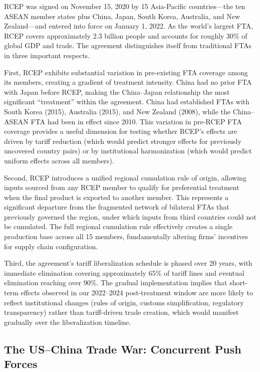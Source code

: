 \documentclass[preprint,12pt,authoryear]{elsarticle}
\begin{document}
RCEP was signed on November 15, 2020 by 15 Asia-Pacific countries---the ten ASEAN member states plus China, Japan, South Korea, Australia, and New Zealand---and entered into force on January 1, 2022. As the world's largest FTA, RCEP covers approximately 2.3 billion people and accounts for roughly 30\% of global GDP and trade. The agreement distinguishes itself from traditional FTAs in three important respects.

First, RCEP exhibits substantial variation in pre-existing FTA coverage among its members, creating a gradient of treatment intensity. China had no prior FTA with Japan before RCEP, making the China--Japan relationship the most significant ``treatment'' within the agreement. China had established FTAs with South Korea (2015), Australia (2015), and New Zealand (2008), while the China--ASEAN FTA had been in effect since 2010. This variation in pre-RCEP FTA coverage provides a useful dimension for testing whether RCEP's effects are driven by tariff reduction (which would predict stronger effects for previously uncovered country pairs) or by institutional harmonization (which would predict uniform effects across all members).

Second, RCEP introduces a unified regional cumulation rule of origin, allowing inputs sourced from any RCEP member to qualify for preferential treatment when the final product is exported to another member. This represents a significant departure from the fragmented network of bilateral FTAs that previously governed the region, under which inputs from third countries could not be cumulated. The full regional cumulation rule effectively creates a single production base across all 15 members, fundamentally altering firms' incentives for supply chain configuration.

Third, the agreement's tariff liberalization schedule is phased over 20 years, with immediate elimination covering approximately 65\% of tariff lines and eventual elimination reaching over 90\%. The gradual implementation implies that short-term effects observed in our 2022--2024 post-treatment window are more likely to reflect institutional changes (rules of origin, customs simplification, regulatory transparency) rather than tariff-driven trade creation, which would manifest gradually over the liberalization timeline.

\subsection{The US--China Trade War: Concurrent Push Forces}
\end{document}
